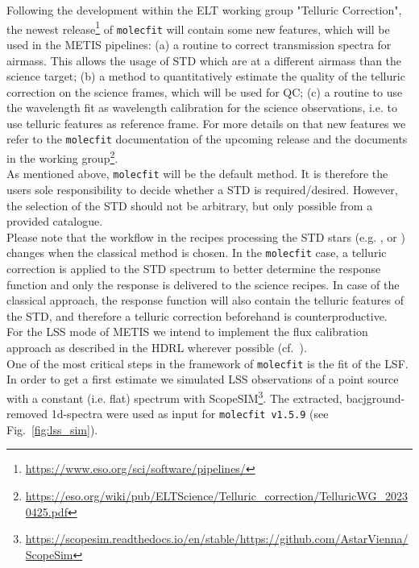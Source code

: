 Following the development within the \ac{ELT} working group "Telluric Correction", the newest release\footnote{\url{https://www.eso.org/sci/software/pipelines/}} of \texttt{molecfit} will contain some new features, which will be used in the \ac{METIS} pipelines: (a) a routine to correct transmission spectra for airmass. This allows the usage of \ac{STD} which are at a different airmass than the science target; (b) a method to quantitatively estimate the quality of the telluric correction on the science frames, which will be used for \ac{QC}; (c) a routine to use the wavelength fit as wavelength calibration for the science observations, i.e. to use telluric features as reference frame. For more details on that new features we refer to the \texttt{molecfit} documentation of the upcoming release and the documents in the working group\footnote{\url{https://eso.org/wiki/pub/ELTScience/Telluric_correction/TelluricWG_20230425.pdf}}.\\
As mentioned above, \texttt{molecfit} will be the default method. It is therefore the users sole responsibility to decide whether a \ac{STD} is required/desired. However, the selection of the \ac{STD} should not be arbitrary, but only possible from a provided catalogue.\\
Please note that the workflow in the recipes processing the \ac{STD} stars (e.g. ,  or ) changes when the classical method is chosen. In the \texttt{molecfit} case, a telluric correction is applied to the \ac{STD} spectrum to better determine the response function and only the response is delivered to the science recipes. In case of the classical approach, the response function will also contain the telluric features of the \ac{STD}, and therefore a telluric correction beforehand is counterproductive.\\
For the \ac{LSS} mode of \ac{METIS} we intend to implement the flux calibration approach as described in the \ac{HDRL} wherever possible (cf.~\cite{hdrl-manual}).\\ %
One of the most critical steps in the framework of \texttt{molecfit} is the fit of the \ac{LSF}. In order to get a first estimate we simulated \ac{LSS} observations of a point source with a constant (i.e. flat) spectrum with ScopeSIM\footnote{\url{https://scopesim.readthedocs.io/en/stable/}\newline\url{https://github.com/AstarVienna/ScopeSim}}. The extracted, bacjground-removed 1d-spectra were used as input for \texttt{molecfit v1.5.9} (see Fig.~\ref{fig:lss_sim}). 
